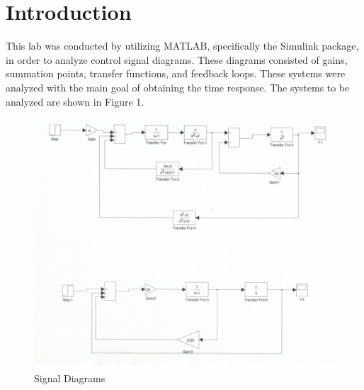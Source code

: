 \documentclass[12pt]{article}
\begin{document}
\newpage


\section*{\fontsize{12}{12}\selectfont \large Introduction}
This lab was conducted by utilizing MATLAB, specifically the Simulink package, in order to analyze control signal diagrams. These diagrams consisted of gains, summation points, transfer functions, and feedback loops. These systems were analyzed with the main goal of obtaining the time response. The systems to be analyzed are shown in Figure 1. 
\bigskip
\bigskip

\begin{figure}[htbp] %
   \centering
   \includegraphics[width=\linewidth]{signal_diagrams.jpg} 
   \caption{Signal Diagrams}
   \label{fig:example}
\end{figure}

\newpage


\end{document}
